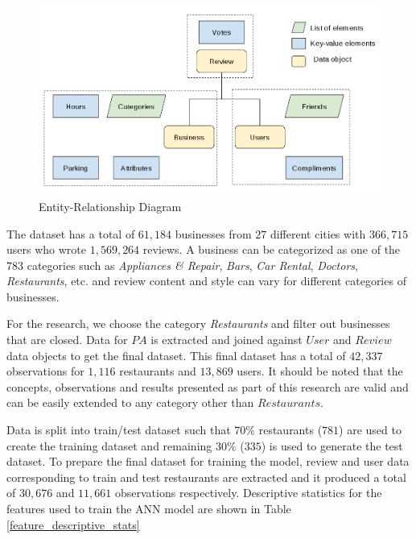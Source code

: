 \documentclass[12pt]{article}
\begin{document}
\begin{figure}[h]
\centering
\includegraphics[width=0.7\linewidth]{figure_er_diagram}
\caption{Entity-Relationship Diagram}
\label{fig:figure_er_diagram}
\end{figure}

The dataset has a total of $61,184$ businesses from $27$ different cities with $366,715$ users who wrote $1,569,264$ reviews. A business can be categorized as one of the 783 categories such as \textit{Appliances \& Repair}, \textit{Bars}, \textit{Car Rental}, \textit{Doctors}, \textit{Restaurants}, etc. and review content and style can vary for different categories of businesses. 

For the research, we choose the category \textit{Restaurants} and filter out businesses that are closed. Data for $PA$ is extracted and joined against $User$ and $Review$ data objects to get the final dataset. This final dataset has a total of $42,337$ observations for $1,116$ restaurants and $13,869$ users. It should be noted that the concepts, observations and results presented as part of this research are valid and can be easily extended to any category other than $Restaurants$.

Data is split into train/test dataset such that $70\%$ restaurants ($781$) are used to create the training dataset and remaining $30\%$ ($335$) is used to generate the test dataset. To prepare the final dataset for training the model, review and user data corresponding to train and test restaurants are extracted and it produced a total of $30,676$ and $11,661$ observations respectively. Descriptive statistics for the features used to train the ANN model are shown in Table \ref{feature_descriptive_stats}
\end{document}
